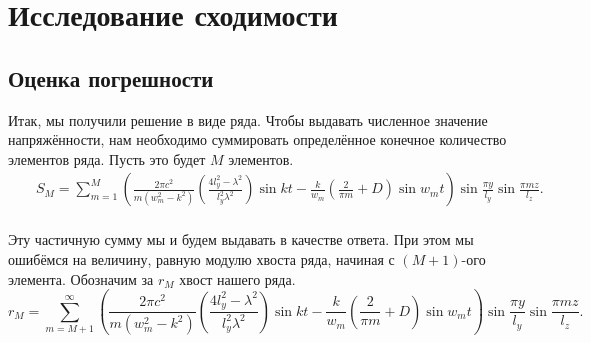 \chapter{Исследование сходимости}
\section{Оценка погрешности}

Итак, мы получили решение в виде ряда. Чтобы выдавать численное значение напряжённости, нам необходимо суммировать определённое конечное количество элементов ряда. Пусть это будет $M$ элементов.
\begin{eqnarray*}
&&S_M = \sum \limits_{m=1}^{M} \left( \frac{2\pi c^2}{m(w_m^2 - k^2)}\left(\frac{4l_y^2 - \lambda^2}{l_y^2\lambda^2} \right)\sin{kt} - \frac{k}{w_m}\left(\frac{2}{\pi m} + D\right)\sin{w_mt} \right) \sin\frac{\pi y}{l_y} \sin\frac{\pi m z}{l_z}.\\
\end{eqnarray*}

Эту частичную сумму мы и будем выдавать в качестве ответа. При этом мы ошибёмся на величину, равную модулю хвоста ряда, начиная с $(M+1)$-ого элемента. Обозначим за $r_M$ хвост нашего ряда.
\[
r_M = \sum \limits_{m=M+1}^{\infty} \left( \frac{2\pi c^2}{m(w_m^2 - k^2)}\left(\frac{4l_y^2 - \lambda^2}{l_y^2\lambda^2} \right)\sin{kt} - \frac{k}{w_m}\left(\frac{2}{\pi m} + D\right)\sin{w_mt} \right) \sin\frac{\pi y}{l_y} \sin\frac{\pi m z}{l_z}.
\]

